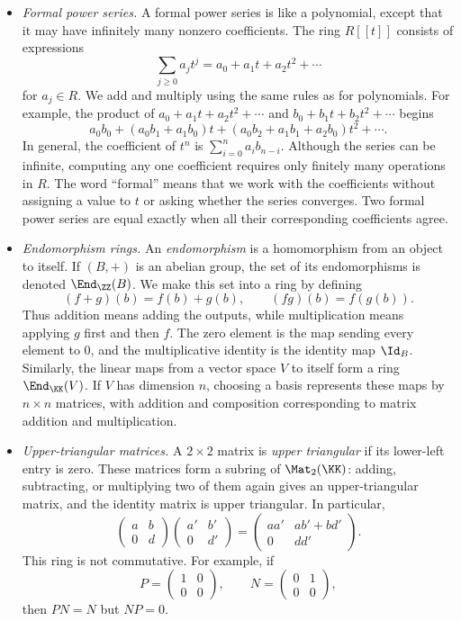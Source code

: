 \documentclass[12pt,reqno]{amsart}
\begin{document}
 \begin{itemize}
\item \emph{Formal power series.} A formal power series is like a polynomial, except that it may have infinitely many nonzero coefficients. The ring $R[[t]]$ consists of expressions
\[
\sum_{j\geq0} a_j t^j = a_0+a_1t+a_2t^2+\cdots
\]
for $a_j \in R$. We add and multiply using the same rules as for polynomials. For example, the product of $a_0+a_1t+a_2t^2+\cdots$ and $b_0+b_1t+b_2t^2+\cdots$ begins
\[
a_0b_0+(a_0b_1+a_1b_0)t
+(a_0b_2+a_1b_1+a_2b_0)t^2+\cdots.
\]
In general, the coefficient of $t^n$ is $\sum_{i=0}^n a_ib_{n-i}$. Although the series can be infinite, computing any one coefficient requires only finitely many operations in $R$. The word ``formal'' means that we work with the coefficients without assigning a value to $t$ or asking whether the series converges. Two formal power series are equal exactly when all their corresponding coefficients agree.

\item \emph{Endomorphism rings.} An \emph{endomorphism} is a homomorphism from an object to itself. If $(B,+)$ is an abelian group, the set of its endomorphisms is denoted $\End_{\ZZ}(B)$. We make this set into a ring by defining
\[
(f+g)(b)=f(b)+g(b),
\qquad
(fg)(b)=f(g(b)).
\]
Thus addition means adding the outputs, while multiplication means applying $g$ first and then $f$. The zero element is the map sending every element to $0$, and the multiplicative identity is the identity map $\Id_B$. Similarly, the linear maps from a vector space $V$ to itself form a ring $\End_\KK(V)$. If $V$ has dimension $n$, choosing a basis represents these maps by $n\times n$ matrices, with addition and composition corresponding to matrix addition and multiplication.

\item \emph{Upper-triangular matrices.} A $2\times2$ matrix is \emph{upper triangular} if its lower-left entry is zero. These matrices form a subring of $\Mat_2(\KK)$: adding, subtracting, or multiplying two of them again gives an upper-triangular matrix, and the identity matrix is upper triangular. In particular,
\[
\begin{pmatrix}a&b\\0&d\end{pmatrix}
\begin{pmatrix}a'&b'\\0&d'\end{pmatrix}
=
\begin{pmatrix}aa'&ab'+bd'\\0&dd'\end{pmatrix}.
\]
This ring is not commutative. For example, if
\[
P=\begin{pmatrix}1&0\\0&0\end{pmatrix},
\qquad
N=\begin{pmatrix}0&1\\0&0\end{pmatrix},
\]
then $PN=N$ but $NP=0$.


\end{itemize}
\end{document}
